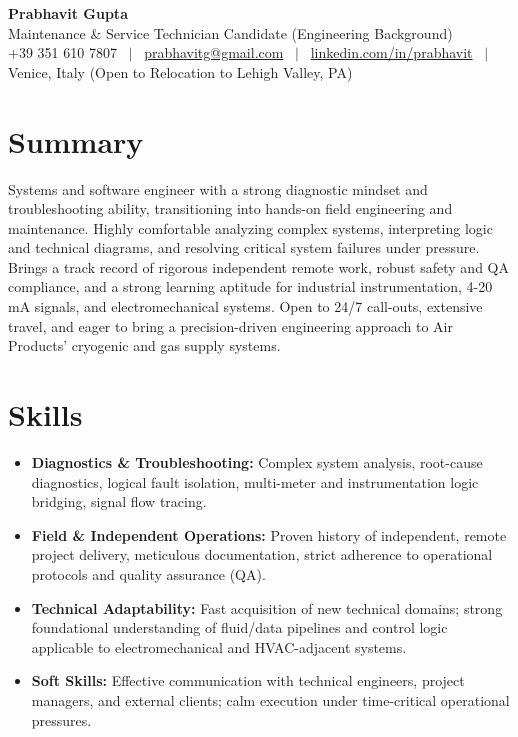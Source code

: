 \documentclass[a4paper,10pt]{article}
\begin{document}
\begin{center}
 {\Huge\bfseries Prabhavit Gupta}\\[3pt]
 {\color{accent}\large Maintenance \& Service Technician Candidate (Engineering Background)}\\[6pt]
 {\footnotesize +39 351 610 7807 ~$\vert$~
 \href{mailto:prabhavitg@gmail.com}{prabhavitg@gmail.com} ~$\vert$~
 \href{https://www.linkedin.com/in/prabhavit/}{linkedin.com/in/prabhavit} ~$\vert$~
 Venice, Italy (Open to Relocation to Lehigh Valley, PA)}
\end{center}
\vspace{2pt}

\section{Summary}
Systems and software engineer with a strong diagnostic mindset and troubleshooting ability, transitioning into hands-on field engineering and maintenance. Highly comfortable analyzing complex systems, interpreting logic and technical diagrams, and resolving critical system failures under pressure. Brings a track record of rigorous independent remote work, robust safety and QA compliance, and a strong learning aptitude for industrial instrumentation, 4-20 mA signals, and electromechanical systems. Open to 24/7 call-outs, extensive travel, and eager to bring a precision-driven engineering approach to Air Products' cryogenic and gas supply systems.

\section{Skills}
\begin{itemize}
 \item \textbf{Diagnostics \& Troubleshooting:} Complex system analysis, root-cause diagnostics, logical fault isolation, multi-meter and instrumentation logic bridging, signal flow tracing.
 \item \textbf{Field \& Independent Operations:} Proven history of independent, remote project delivery, meticulous documentation, strict adherence to operational protocols and quality assurance (QA).
 \item \textbf{Technical Adaptability:} Fast acquisition of new technical domains; strong foundational understanding of fluid/data pipelines and control logic applicable to electromechanical and HVAC-adjacent systems.
 \item \textbf{Soft Skills:} Effective communication with technical engineers, project managers, and external clients; calm execution under time-critical operational pressures.
\end{itemize}
\end{document}
